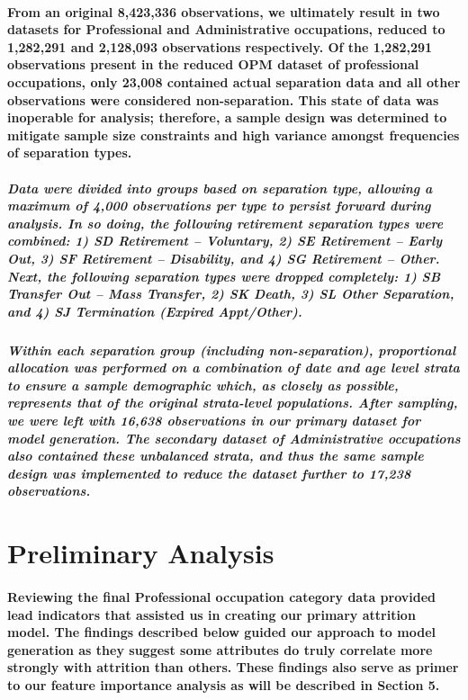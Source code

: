 \documentclass{article}
\begin{document}
\paragraph{From an original 8,423,336 observations, we ultimately result in two datasets for Professional and Administrative occupations, reduced to 1,282,291 and 2,128,093 observations respectively. Of the 1,282,291 observations present in the reduced OPM dataset of professional occupations, only 23,008 contained actual separation data and all other observations were considered non-separation. This state of data was inoperable for analysis; therefore, a sample design was determined to mitigate sample size constraints and high variance amongst frequencies of separation types.}
 
\subparagraph{Data were divided into groups based on separation type, allowing a maximum of 4,000 observations per type to persist forward during analysis. In so doing, the following retirement separation types were combined: 1) SD Retirement – Voluntary, 2) SE Retirement – Early Out, 3) SF Retirement – Disability, and 4) SG Retirement – Other. Next, the following separation types were dropped completely: 1) SB Transfer Out – Mass Transfer, 2) SK Death, 3) SL Other Separation, and 4) SJ Termination (Expired Appt/Other).}
 
\subparagraph{Within each separation group (including non-separation), proportional allocation was performed on a combination of date and age level strata to ensure a sample demographic which, as closely as possible, represents that of the original strata-level populations. After sampling, we were left with 16,638 observations in our primary dataset for model generation. The secondary dataset of Administrative occupations also contained these unbalanced strata, and thus the same sample design was implemented to reduce the dataset further to 17,238 observations.}
 
\section{Preliminary Analysis}

\paragraph{Reviewing the final Professional occupation category data provided lead indicators that assisted us in creating our primary attrition model. The findings described below guided our approach to model generation as they suggest some attributes do truly correlate more strongly with attrition than others. These findings also serve as primer to our feature importance analysis as will be described in Section 5.}
 
\end{document}
